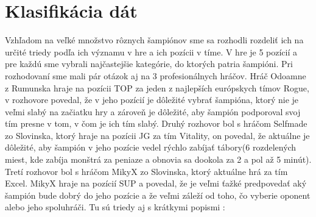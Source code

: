 \section{Klasifikácia dát}
Vzhľadom na veľké množstvo rôznych šampiónov sme sa rozhodli rozdeliť ich na určité triedy podľa ich významu v hre a ich pozícii v tíme.
V hre je 5 pozícií a pre každú sme vybrali najčastejšie kategórie, do ktorých patria šampióni. Pri rozhodovaní sme mali pár otázok aj na 3 profesionálnych hráčov. Hráč Odoamne z Rumunska hraje na pozícii TOP za jeden z najlepších európskych tímov Rogue, v rozhovore povedal, že v jeho pozícií je dôležité vybrať šampióna, ktorý nie je veľmi slabý na začiatku hry a zároveň je dôležité, aby šampión podporoval svoj tím presne v tom, v čom je ich tím slabý. Druhý rozhovor bol s hráčom Selfmade zo Slovinska, ktorý hraje na pozícii JG za tím Vitality, on povedal, že aktuálne je dôležité, aby šampión v jeho pozície vedel rýchlo zabíjať tábory(6 rozdelených miest, kde zabíja monštrá za peniaze a obnovia sa dookola za 2 a pol až 5 minút). Tretí rozhovor bol s hráčom MikyX zo Slovinska, ktorý aktuálne hrá za tím Excel. MikyX hraje na pozícií SUP a povedal, že je veľmi ťažké predpovedať aký šampión bude dobrý do jeho pozície a že veľmi záleží od toho, čo vyberie oponent alebo jeho spoluhráči.  Tu sú triedy aj s krátkymi popismi :
